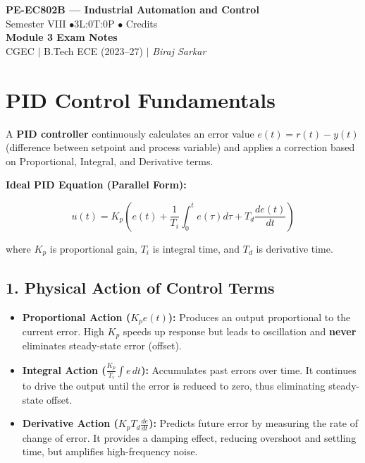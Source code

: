 \documentclass[12pt,a4paper]{article}
\begin{document}

\begin{center}
  {\LARGE\bfseries\color{myred} PE-EC802B --- Industrial Automation and Control}\\[5pt]
  {\normalsize\color{mydark} Semester VIII \quad$\bullet$\quad 3L:0T:0P \quad$\bullet$ Credits}\\[3pt]
  {\normalsize\color{myteal}\textbf{Module 3 Exam Notes}}\\[3pt]
  {\small\color{mydark} CGEC \;$|$\; B.Tech ECE (2023--27) \;$|$\; \textit{Biraj Sarkar}}
\end{center}
\vspace{2pt}
\noindent{\color{myred}\rule{\linewidth}{1.5pt}}
\vspace{2pt}

\hypersetup{linkcolor=mydark}
\tableofcontents
\hypersetup{linkcolor=myteal}
\newpage

\section{PID Control Fundamentals}

A \textbf{PID controller} continuously calculates an error value $e(t) = r(t) - y(t)$ (difference between setpoint and process variable) and applies a correction based on Proportional, Integral, and Derivative terms.

\textbf{Ideal PID Equation (Parallel Form):}
\begin{tcolorbox}[formulabox, title={\textbf{Time-Domain PID Control Equation}}]
\[
u(t) = K_p \left( e(t) + \frac{1}{T_i} \int_{0}^{t} e(\tau) d\tau + T_d \frac{de(t)}{dt} \right)
\]
\end{tcolorbox}
where $K_p$ is proportional gain, $T_i$ is integral time, and $T_d$ is derivative time.

\subsection{1. Physical Action of Control Terms}
\begin{itemize}[leftmargin=*, itemsep=2.5pt]
  \item \textbf{Proportional Action ($K_p e(t)$):} Produces an output proportional to the current error. High $K_p$ speeds up response but leads to oscillation and \textbf{never} eliminates steady-state error (offset).
  \item \textbf{Integral Action ($\frac{K_p}{T_i} \int e\,dt$):} Accumulates past errors over time. It continues to drive the output until the error is reduced to zero, thus eliminating steady-state offset.
  \item \textbf{Derivative Action ($K_p T_d \frac{de}{dt}$):} Predicts future error by measuring the rate of change of error. It provides a damping effect, reducing overshoot and settling time, but amplifies high-frequency noise.
\end{itemize}
\end{document}
